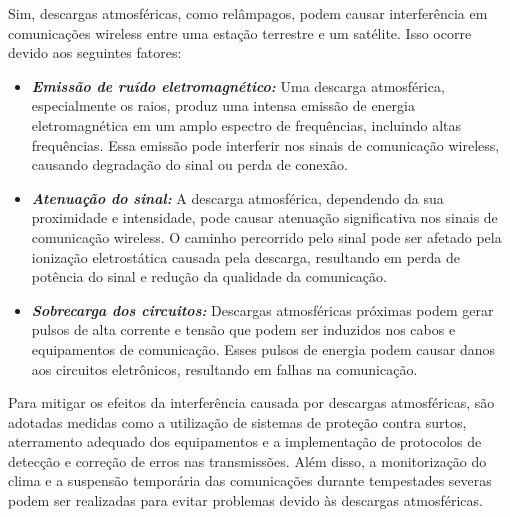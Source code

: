 \documentclass[a4paper, 12pt, onecolumn,singlespacing]{article}
\begin{document}
	Sim, descargas atmosféricas, como relâmpagos, podem causar interferência em comunicações wireless entre uma estação terrestre e um satélite. Isso ocorre devido aos seguintes fatores:
	
	\begin{itemize}
		\item \textbf{\textit{Emissão de ruído eletromagnético:}} Uma descarga atmosférica, especialmente os raios, produz uma intensa emissão de energia eletromagnética em um amplo espectro de frequências, incluindo altas frequências. Essa emissão pode interferir nos sinais de comunicação wireless, causando degradação do sinal ou perda de conexão.
		
		\item \textbf{\textit{Atenuação do sinal:}} A descarga atmosférica, dependendo da sua proximidade e intensidade, pode causar atenuação significativa nos sinais de comunicação wireless. O caminho percorrido pelo sinal pode ser afetado pela ionização eletrostática causada pela descarga, resultando em perda de potência do sinal e redução da qualidade da comunicação.
		
		\item \textbf{\textit{Sobrecarga dos circuitos:}} Descargas atmosféricas próximas podem gerar pulsos de alta corrente e tensão que podem ser induzidos nos cabos e equipamentos de comunicação. Esses pulsos de energia podem causar danos aos circuitos eletrônicos, resultando em falhas na comunicação.
	\end{itemize}

	
	Para mitigar os efeitos da interferência causada por descargas atmosféricas, são adotadas medidas como a utilização de sistemas de proteção contra surtos, aterramento adequado dos equipamentos e a implementação de protocolos de detecção e correção de erros nas transmissões. Além disso, a monitorização do clima e a suspensão temporária das comunicações durante tempestades severas podem ser realizadas para evitar problemas devido às descargas atmosféricas.
	
	
	
\end{document}
